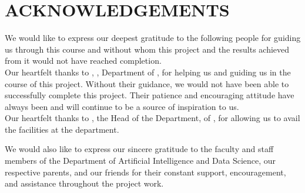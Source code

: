 \clearpage
{}
{}
\chapter*{ACKNOWLEDGEMENTS}

\noindent
\fontsize{12pt}{18pt}\selectfont We would like to express our deepest gratitude to the following people for guiding us through this course and without whom this project and the results achieved from it would not have reached completion.\\

\noindent
Our heartfelt thanks to \textbf{\thesisguide}, \textbf{\thesisguidedesig}, Department of \thesisdept, for helping us and guiding us in the course of this project. Without their guidance, we would not have been able to successfully complete this project. Their patience and encouraging attitude have always been and will continue to be a source of inspiration to us.\\

\noindent
Our heartfelt thanks to \textbf{\depthod}, the Head of the Department,  of \thesisdept, for allowing us to avail the facilities at the department.\\

\noindent

We would also like to express our sincere gratitude to the faculty and staff members of the Department of Artificial Intelligence and Data Science, our respective parents, and our friends for their constant support, encouragement, and assistance throughout the project work.

